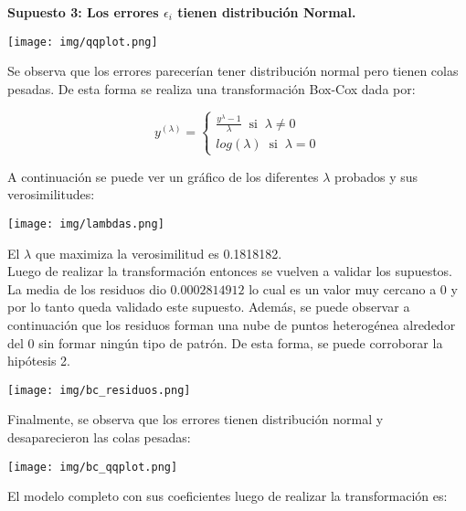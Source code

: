 \documentclass{article}
\begin{document}
\noindent
\textbf{Supuesto 3: Los errores \(\epsilon_i\) tienen distribución Normal.}\\

\begin{center}
    \texttt{[image: img/qqplot.png]}
\end{center}

\noindent
Se observa que los errores parecerían tener distribución normal pero tienen colas pesadas. De esta forma se realiza una transformación Box-Cox dada por:

$$y^{(\lambda)} = \begin{cases}
                            \frac{y^{\lambda}-1}{\lambda} \; \; \text{si} \; \;  \lambda \neq 0\\
                            log(\lambda) \; \; \text{si} \; \; \lambda = 0
                        \end{cases}$$

\noindent
A continuación se puede ver un gráfico de los diferentes $\lambda$ probados y sus verosimilitudes:

\begin{center}
    \texttt{[image: img/lambdas.png]}
\end{center}

\noindent
El $\lambda$ que maximiza la verosimilitud es 0.1818182.\\

\noindent
Luego de realizar la transformación entonces se vuelven a validar los supuestos. La media de los residuos dio \(0.0002814912\) lo cual es un valor muy cercano a 0 y por lo tanto queda validado este supuesto. Además, se puede observar a continuación que los residuos forman una nube de puntos heterogénea alrededor del 0 sin formar ningún tipo de patrón. De esta forma, se puede corroborar la hipótesis 2.

\begin{center}
    \texttt{[image: img/bc\_residuos.png]}
\end{center}

\noindent
Finalmente, se observa que los errores tienen distribución normal y desaparecieron las colas pesadas:

\begin{center}
    \texttt{[image: img/bc\_qqplot.png]}
\end{center}

\noindent
El modelo completo con sus coeficientes luego de realizar la transformación es:
\end{document}
